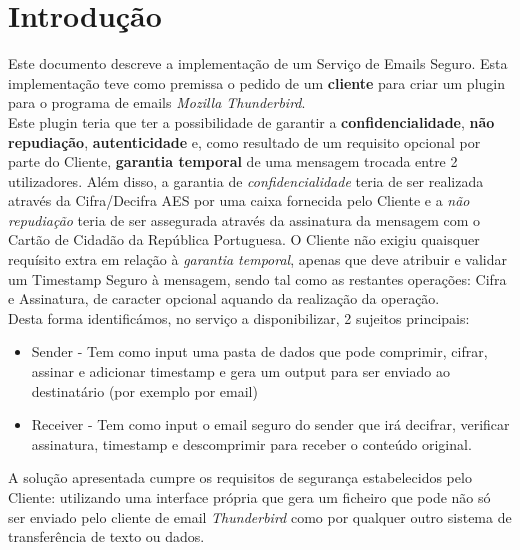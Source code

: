 \chapter{Introdução}
\label{chapter:introduction}
Este documento descreve a implementação de um Serviço de Emails Seguro. Esta implementação teve como premissa o pedido de um \textbf{cliente} para criar um plugin para o programa de emails \textit{Mozilla Thunderbird}. \\
Este plugin teria que ter a possibilidade de garantir a \textbf{confidencialidade}, \textbf{não repudiação}, \textbf{autenticidade} e, como resultado de um requisito opcional por parte do Cliente, \textbf{garantia 
temporal} de uma mensagem trocada entre 2 utilizadores. Além disso, a garantia de 
\textit{confidencialidade} teria de ser realizada através da Cifra/Decifra AES por uma caixa fornecida pelo 
Cliente e a \textit{não repudiação} teria de ser assegurada através da assinatura da 
mensagem com o Cartão de Cidadão da República Portuguesa. O Cliente não exigiu quaisquer requísito extra em relação à \textit{garantia temporal}, apenas que deve atribuir e validar um Timestamp Seguro à mensagem, sendo tal como as restantes operações: Cifra e Assinatura, de caracter opcional aquando da realização da operação.
\\
Desta forma identificámos, no serviço a disponibilizar,  2 sujeitos principais:
\begin{itemize}
\item Sender -  Tem como input uma pasta de dados que pode comprimir, cifrar, assinar e adicionar timestamp 
e gera um output para ser enviado ao destinatário (por exemplo por email)
\item Receiver - Tem como input o email seguro do sender que irá decifrar, verificar assinatura, timestamp 
e descomprimir para receber o conteúdo original.
\end{itemize}
A solução apresentada cumpre os requisitos de segurança estabelecidos pelo 
Cliente: utilizando uma interface própria que gera um ficheiro que pode não só 
ser enviado pelo cliente de email  \textit{Thunderbird} como por qualquer outro 
sistema de transferência de texto ou dados.\\


